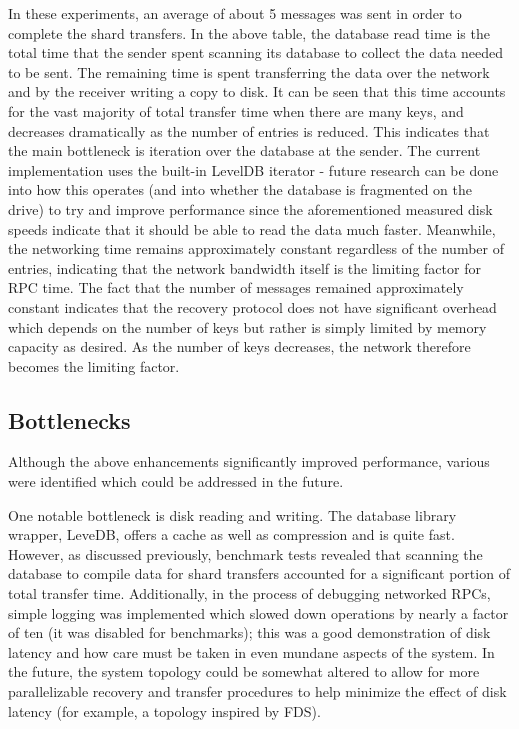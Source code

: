\documentclass[letterpaper,10pt]{article}
\begin{document}
In these experiments, an average of about 5 messages was sent in order
to complete the shard transfers.  In the above table, the database
read time is the total time that the sender spent scanning its
database to collect the data needed to be sent.  The remaining time is
spent transferring the data over the network and by the receiver
writing a copy to disk.  It can be seen that this time accounts for
the vast majority of total transfer time when there are many keys, and
decreases dramatically as the number of entries is reduced.  This
indicates that the main bottleneck is iteration over the database at
the sender.  The current implementation uses the built-in LevelDB
iterator - future research can be done into how this operates (and
into whether the database is fragmented on the drive) to try and
improve performance since the aforementioned measured disk speeds
indicate that it should be able to read the data much faster.
Meanwhile, the networking time remains approximately constant
regardless of the number of entries, indicating that the network
bandwidth itself is the limiting factor for RPC time.  The fact that
the number of messages remained approximately constant indicates that
the recovery protocol does not have significant overhead which depends
on the number of keys but rather is simply limited by memory capacity
as desired.  As the number of keys decreases, the network therefore
becomes the limiting factor.





\subsection{Bottlenecks}
Although the above enhancements significantly improved performance,
various were identified which could be addressed in the future.

One notable bottleneck is disk reading and writing.  The database
library wrapper, LeveDB, offers a cache as well as compression and is
quite fast.  However, as discussed previously, benchmark tests
revealed that scanning the database to compile data for shard
transfers accounted for a significant portion of total transfer time.
Additionally, in the process of debugging networked RPCs, simple
logging was implemented which slowed down operations by nearly a
factor of ten (it was disabled for benchmarks); this was a good
demonstration of disk latency and how care must be taken in even
mundane aspects of the system.  In the future, the system topology
could be somewhat altered to allow for more parallelizable recovery
and transfer procedures to help minimize the effect of disk latency
(for example, a topology inspired by FDS).
\end{document}
